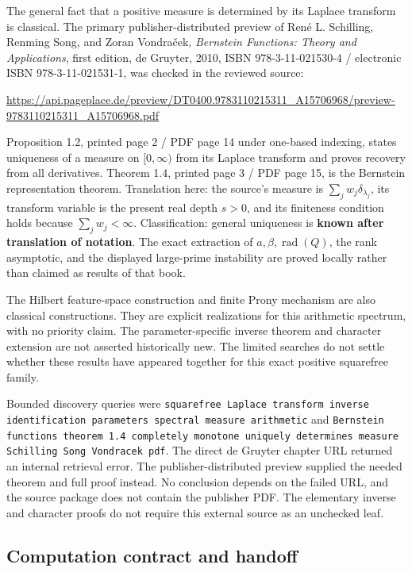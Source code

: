 The general fact that a positive measure is determined by its Laplace
transform is classical. The primary publisher-distributed preview of
René L. Schilling, Renming Song, and Zoran Vondraček, \emph{Bernstein
Functions: Theory and Applications}, first edition, de Gruyter, 2010,
ISBN 978-3-11-021530-4 / electronic ISBN 978-3-11-021531-1, was checked
in the reviewed source:

\url{https://api.pageplace.de/preview/DT0400.9783110215311_A15706968/preview-9783110215311_A15706968.pdf}

Proposition 1.2, printed page 2 / PDF page 14 under one-based indexing,
states uniqueness of a measure on \([0,\infty)\) from its Laplace
transform and proves recovery from all derivatives. Theorem 1.4, printed
page 3 / PDF page 15, is the Bernstein representation theorem.
Translation here: the source's measure is
\(\sum_jw_j\delta_{\lambda_j}\), its transform variable is the present
real depth \(s>0\), and its finiteness condition holds because
\(\sum_jw_j<\infty\). Classification: general uniqueness is
\textbf{known after translation of notation}. The exact extraction of
\(a,\beta,\operatorname{rad}(Q)\), the rank asymptotic, and the
displayed large-prime instability are proved locally rather than claimed
as results of that book.

The Hilbert feature-space construction and finite Prony mechanism are
also classical constructions. They are explicit realizations for this
arithmetic spectrum, with no priority claim. The parameter-specific
inverse theorem and character extension are not asserted historically
new. The limited searches do not settle whether these results have
appeared together for this exact positive squarefree family.

Bounded discovery queries were
\texttt{\small squarefree Laplace transform inverse identification parameters spectral measure arithmetic}
and
\texttt{\small Bernstein functions theorem 1.4 completely monotone uniquely determines measure Schilling Song Vondracek pdf}.
The direct de Gruyter chapter URL returned an internal retrieval error.
The publisher-distributed preview supplied the needed theorem and full
proof instead. No conclusion depends on the failed URL, and the source package does not contain the publisher PDF. The elementary inverse
and character proofs do not require this external source as an unchecked
leaf.

\hypertarget{computation-contract-and-handoff}{%
\subsection{Computation contract and
handoff}\label{computation-contract-and-handoff}}

